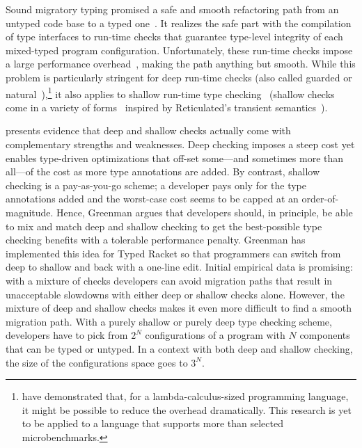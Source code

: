 
Sound migratory typing promised a safe and smooth refactoring path from an
untyped code base to a typed one~\cite{tf-dls-2006, tfffgksst-snapl-2017}. It
realizes the safe part with the compilation of type interfaces to run-time
checks that guarantee type-level integrity of each mixed-typed program configuration.
Unfortunately, these run-time checks impose a large performance
overhead~\cite{gtnffvf-jfp-2019}, making the path anything but smooth. While
this problem is particularly stringent for deep run-time checks (also called
guarded or natural~\cite{tf-dls-2006,st-sfp-2006}),\footnote{\citet{kas-pldi-2019}
have demonstrated that, for a lambda-calculus-sized programming language, it
might be possible to reduce the overhead dramatically. This research is yet to
be applied to a language that supports more than selected microbenchmarks.}
it also applies to shallow run-time type checking~\cite{gm-pepm-2018} (shallow
checks come in a variety of
forms~\cite{grmhn-vmil-2019,rmhn-ecoop-2019,glfd-pj-2022,lgmvpk-pj-2023}
inspired by Reticulated's transient
semantics~\cite{vksb-dls-2014,vss-popl-2017,v-thesis-2019}).

\citet{g-thesis-2020,g-deep-shallow} presents evidence that deep and shallow
checks actually come with complementary strengths and weaknesses. Deep checking
imposes a steep cost yet enables type-driven optimizations that off-set
some---and sometimes more than all---of the cost as more type annotations are
added. By contrast, shallow checking is a pay-as-you-go scheme; a developer pays
only for the type annotations added and the worst-case cost seems to be capped
at an order-of-magnitude. Hence, Greenman argues that developers should, in
principle, be able to mix and match deep and shallow checking to get the
best-possible type checking benefits with a tolerable performance penalty.
Greenman has implemented this idea for Typed Racket so that programmers can
switch from deep to shallow and back with a one-line edit.  Initial empirical data
is promising: with a mixture of checks developers can avoid migration paths that
result in unacceptable slowdowns with either deep or shallow checks alone.
However, the mixture of deep and shallow checks makes it even more difficult to
find a smooth migration path. With a purely shallow or purely deep type checking
scheme, developers have to pick from $2^N$ configurations of a program with $N$
components that can be typed or untyped. In a context with both deep and shallow
checking, the size of the configurations space goes to $3^N$.

